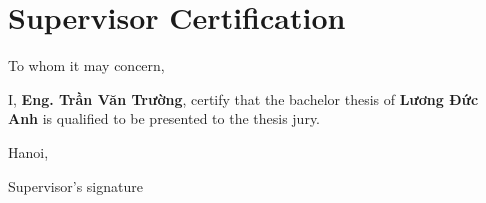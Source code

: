 {  \section*{Supervisor Certification}
  To whom it may concern,

  I, \textbf{Eng. Trần Văn Trường}, certify that the bachelor thesis of
  \textbf{Lương Đức Anh} is qualified to be presented to the thesis jury.

  \vspace{1.5cm}
  Hanoi, \@date

  \vspace{2.0cm}
  \begin{flushright}
  Supervisor's signature
  \end{flushright}
  \clearpage
}
\makeatother
